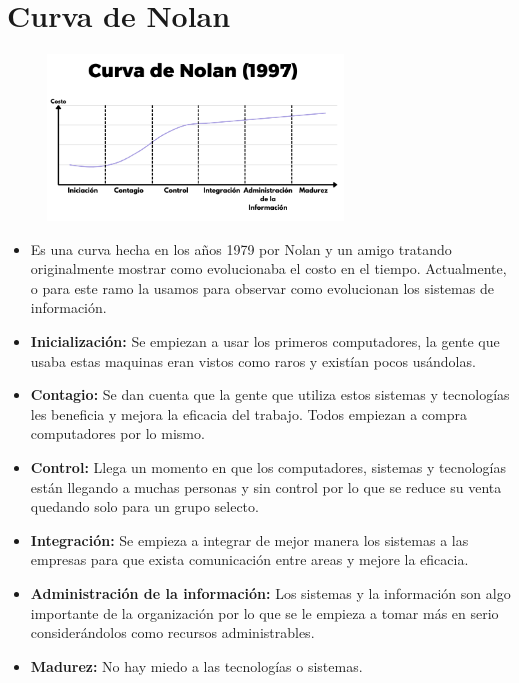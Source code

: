 \documentclass{templateNote}
\begin{document}
\section{Curva de Nolan}
\begin{figure}[H]
    \centering
    \includegraphics[width=0.7\textwidth]{img/CurvaDeNolan.png}
\end{figure}
\begin{itemize}
    \item Es una curva hecha en los años 1979 por Nolan y un amigo tratando originalmente mostrar como evolucionaba el costo en el tiempo. Actualmente, o para este ramo la usamos para observar como evolucionan los sistemas de información.
    
    \item \textbf{Inicialización:} Se empiezan a usar los primeros computadores, la gente que usaba estas maquinas eran vistos como raros y existían pocos usándolas.
    
    \item \textbf{Contagio:} Se dan cuenta que la gente que utiliza estos sistemas y tecnologías les beneficia y mejora la eficacia del trabajo. Todos empiezan a compra computadores por lo mismo.
    
    \item \textbf{Control:} Llega un momento en que los computadores, sistemas y tecnologías están llegando a muchas personas y sin control por lo que se reduce su venta quedando solo para un grupo selecto.
    
    \item \textbf{Integración:} Se empieza a integrar de mejor manera los sistemas a las empresas para que exista comunicación entre areas y mejore la eficacia.
    
    \item \textbf{Administración de la información:} Los sistemas y la información son algo importante de la organización por lo que se le empieza a tomar más en serio considerándolos como recursos administrables.
    
    \item \textbf{Madurez:} No hay miedo a las tecnologías o sistemas.
\end{itemize}
\end{document}
